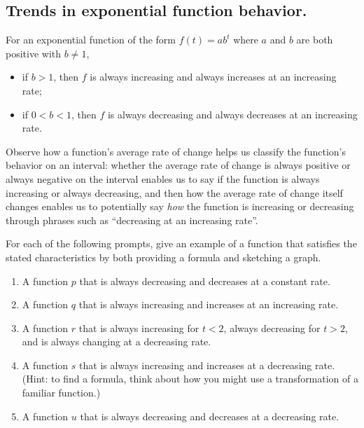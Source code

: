 \documentclass[nooutcomes]{ximera}
\begin{document}
\begin{callout}
\section{Trends in exponential function behavior.}
For an exponential function of the form \(f(t) = ab^t\) where \(a\) and \(b\) are both positive with \(b \ne 1\),\leavevmode%
\begin{itemize}[label=\textbullet]
\item{}\hypertarget{p-1228}{}%
if \(b \gt 1\), then \(f\) is always increasing and always increases at an increasing rate;%
\item{}\hypertarget{p-1229}{}%
if \(0 \lt b \lt 1\), then \(f\) is always decreasing and always decreases at an increasing rate.%
\end{itemize}
\end{callout}

Observe how a function's average rate of change helps us classify the function's behavior on an interval:  whether the average rate of change is always positive or always negative on the interval enables us to say if the function is always increasing or always decreasing, and then how the average rate of change itself changes enables us to potentially say \emph{how} the function is increasing or decreasing through phrases such as ``decreasing at an increasing rate''.

\begin{exploration}

For each of the following prompts, give an example of a function that satisfies the stated characteristics by both providing a formula and sketching a graph.

\begin{enumerate}[label=\alph*.]
\item A function \(p\) that is always decreasing and decreases at a constant rate.
\item A function \(q\) that is always increasing and increases at an increasing rate.
\item A function \(r\) that is always increasing for \(t \lt 2\), always decreasing for \(t \gt 2\), and is always changing at a decreasing rate.
\item A function \(s\) that is always increasing and increases at a decreasing rate.  (Hint: to find a formula, think about how you might use a transformation of a familiar function.)
\item A function \(u\) that is always decreasing and decreases at a decreasing rate.

\end{enumerate}

\end{exploration}
\end{document}
